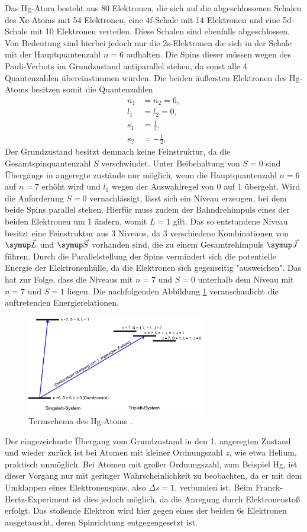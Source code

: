 Das Hg-Atom besteht aus 80 Elektronen, die sich auf die abgeschlossenen Schalen
des Xe-Atoms mit 54 Elektronen, eine 4f-Schale mit 14 Elektronen und eine
5d-Schale mit 10 Elektronen verteilen. Diese Schalen sind ebenfalls abgeschlossen. Von Bedeutung
sind hierbei jedoch nur die 2s-Elektronen die sich in der Schale mit der
Hauptquantenzahl $n=6$ aufhalten. Die Spins dieser müssen wegen des
Pauli-Verbots im Grundzustand antiparallel stehen, da sonst alle 4
Quantenzahlen übereinstimmen würden.
Die beiden äußersten Elektronen des Hg-Atoms besitzen somit die
Quantenzahlen
\begin{align*}
  n_1 &= n_2 = 6, \\
  l_1 &= l_2 = 0, \\
  s_1 &= \frac{1}{2}, \\
  s_2 &= - \frac{1}{2}.
\end{align*}
Der Grundzustand besitzt demnach keine Feinstruktur, da die Gesamtspinquantenzahl
$S$ verschwindet. Unter Beibehaltung von $S=0$ sind Übergänge in angeregte
zustände nur möglich, wenn die Hauptquantenzahl $n=6$ auf $n=7$ erhöht wird
und $l_1$ wegen der Auswahlregel von 0 auf 1 übergeht. Wird die Anforderung
$S=0$ vernachlässigt, lässt sich ein Niveau erzeugen, bei dem beide Spins
parallel stehen. Hierfür muss zudem der Bahndrehimpuls eines der beiden
Elektronen um 1 ändern, womit $L=1$ gilt. Das so entstandene Niveau besitzt
eine Feinstruktur aus 3 Niveaus, da 3 verschiedene Kombinationen von
$\su{\vec{L}}$ und $\su{\vec{S}}$ vorhanden sind, die zu einem Gesamtrehimpuls
$\su{\vec{J}}$ führen. Durch die Parallelstellung der Spins vermindert sich
die potentielle Energie der Elektronenhülle, da die Elektronen sich gegenseitig
"ausweichen". Das hat zur Folge, dass die Niveaus mit $n=7$ und $S=0$ unterhalb
dem Niveau mit $n=7$ und $S=1$ liegen. Die nachfolgenden Abbildung \ref{fig:termschema}
veranschaulicht die auftretenden Energierelationen.
\begin{figure}
  \centering
  \includegraphics[width=0.7\textwidth]{bilder/term.jpg}
  \caption{Termschema des Hg-Atoms \cite{601}.}
  \label{fig:termschema}
\end{figure}
Der eingezeichnete Übergang vom Grundzustand in den 1. angeregten Zustand und
wieder zurück ist bei Atomen mit kleiner Ordnungszahl $z$, wie etwa Helium,
praktisch unmöglich. Bei Atomen mit großer Ordnungszahl, zum Beispiel Hg, ist
dieser Vorgang nur mit geringer Wahrscheinlichkeit zu beobachten, da er mit dem
Umklappen  eines Elektronenspins, also $\Delta s=1$, verbunden ist. Beim
Franck-Hertz-Experiment ist dies jedoch möglich, da die Anregung durch
Elektronenstoß erfolgt. Das stoßende Elektron wird hier gegen eines der beiden
6s Elektronen ausgetauscht, deren Spinrichtung entgegengesetzt ist.
